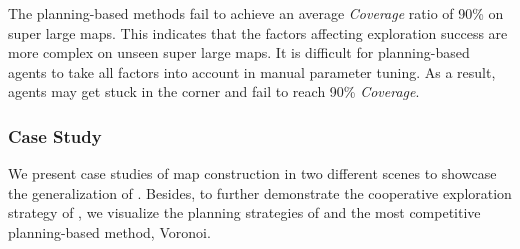The planning-based methods fail to achieve an average \emph{Coverage} ratio of 90\% on super large maps. 
This indicates that the factors affecting exploration success are more complex on unseen super large maps. It is difficult for planning-based agents to take all factors into account in manual parameter tuning. As a result, agents may get stuck in the corner and fail to reach 90\% \emph{Coverage}.




\iffalse
huffman 1bit*480*480 -> (5bit*4+4bit*6)/10 *480*480 -> 1bit*480*480
32 bit == 4 byte
\fi

\subsubsection{Case Study}
We present case studies of map construction in two different scenes to showcase the generalization of {\name}. Besides, to further demonstrate the cooperative exploration strategy of {\name}, we visualize the planning strategies of {\name} and the most competitive planning-based method, Voronoi.



